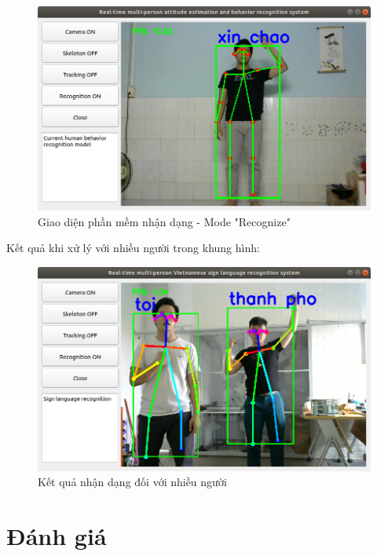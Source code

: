 \begin{figure}[htp]
\begin{center}
\includegraphics[scale=0.5]{chap6/c6_figs/mode_recognize.png}
\end{center}
\caption{Giao diện phần mềm nhận dạng - Mode "Recognize"}
\label{fig:gui3}
\end{figure}
\FloatBarrier
 
Kết quả khi xử lý với nhiều người trong khung hình:

\begin{figure}[htp]
\begin{center}
\includegraphics[scale=0.5]{chap6/c6_figs/kq.png}
\end{center}
\caption{Kết quả nhận dạng đối với nhiều người}
\label{fig:kq}
\end{figure}
\FloatBarrier

\section{Đánh giá}
